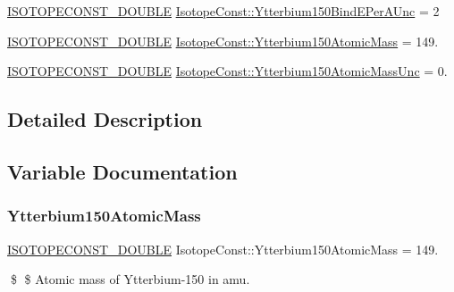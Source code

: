 \begin{DoxyCompactItemize}
\mbox{\hyperlink{group___isotope_const-_macros_ga8f45a7272ce02c0b4c65c44636ed719a}{I\+S\+O\+T\+O\+P\+E\+C\+O\+N\+S\+T\+\_\+\+D\+O\+U\+B\+LE}} \mbox{\hyperlink{group___isotope_const-_ytterbium-_yb150_ga824a2f58f8e82dbefa830adbf7d39429}{Isotope\+Const\+::\+Ytterbium150\+Bind\+E\+Per\+A\+Unc}} = 2
\item 
\mbox{\hyperlink{group___isotope_const-_macros_ga8f45a7272ce02c0b4c65c44636ed719a}{I\+S\+O\+T\+O\+P\+E\+C\+O\+N\+S\+T\+\_\+\+D\+O\+U\+B\+LE}} \mbox{\hyperlink{group___isotope_const-_ytterbium-_yb150_ga5867f5c9c5557cb4862fc6535a1b252a}{Isotope\+Const\+::\+Ytterbium150\+Atomic\+Mass}} = 149.
\item 
\mbox{\hyperlink{group___isotope_const-_macros_ga8f45a7272ce02c0b4c65c44636ed719a}{I\+S\+O\+T\+O\+P\+E\+C\+O\+N\+S\+T\+\_\+\+D\+O\+U\+B\+LE}} \mbox{\hyperlink{group___isotope_const-_ytterbium-_yb150_ga461eb66af7b3e97a9969673b5cfd2a3d}{Isotope\+Const\+::\+Ytterbium150\+Atomic\+Mass\+Unc}} = 0.
\end{DoxyCompactItemize}


\subsection{Detailed Description}


\subsection{Variable Documentation}
\mbox{\label{group___isotope_const-_ytterbium-_yb150_ga5867f5c9c5557cb4862fc6535a1b252a}} 
\subsubsection{\texorpdfstring{Ytterbium150\+Atomic\+Mass}{Ytterbium150AtomicMass}}
{\footnotesize\ttfamily \mbox{\hyperlink{group___isotope_const-_macros_ga8f45a7272ce02c0b4c65c44636ed719a}{I\+S\+O\+T\+O\+P\+E\+C\+O\+N\+S\+T\+\_\+\+D\+O\+U\+B\+LE}} Isotope\+Const\+::\+Ytterbium150\+Atomic\+Mass = 149.}

\$ \$ Atomic mass of Ytterbium-\/150 in amu. \mbox{\label{group___isotope_const-_ytterbium-_yb150_ga461eb66af7b3e97a9969673b5cfd2a3d}} 
